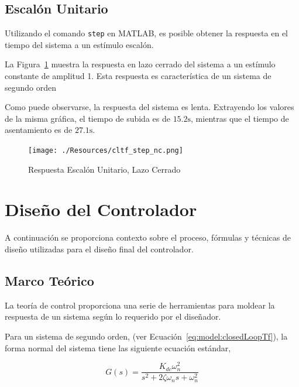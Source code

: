 \documentclass[12pt,a4paper]{article}
\begin{document}
      \subsection{Escalón Unitario}
        
        Utilizando el comando \verb|step| en MATLAB, es posible obtener la respuesta en el tiempo del sistema 
        a un estímulo escalón.   

        La Figura~\ref{fig:response:closedLoopStep} muestra la respuesta en lazo cerrado del sistema a un 
        estímulo constante de amplitud 1. Esta respuesta es característica de un sistema de segundo orden

        Como puede observarse, la respuesta del sistema es lenta. Extrayendo los valores de la misma gráfica, 
        el tiempo de subida es de \(15.2\si{\second}\), mientras que el tiempo de asentamiento es 
        de \(27.1\si{\second}\).

        \begin{figure}
          \centering
          \texttt{[image: ./Resources/cltf\_step\_nc.png]}
          \caption{Respuesta Escalón Unitario, Lazo Cerrado}
          \label{fig:response:closedLoopStep}
        \end{figure}

    \section{Diseño del Controlador}

        A continuación se proporciona contexto sobre el proceso, fórmulas y técnicas de diseño utilizadas para 
        el diseño final del controlador.

        \subsection{Marco Teórico}

        La teoría de control proporciona una serie de herramientas para moldear la respuesta de un sistema según 
        lo requerido por el diseñador. 

        Para un sistema de segundo orden, (ver Ecuación~\ref{eq:model:closedLoopTf}), la forma normal del sistema 
        tiene las siguiente ecuación estándar, 

        \begin{equation}
          G\left(s\right) = \frac{K_{dc}\omega_{n}^{2}}{s^{2} + 2\zeta\omega_{n}s + \omega_{n}^{2}}
          \label{eq:design:2ndorder_std}
        \end{equation}
\end{document}
